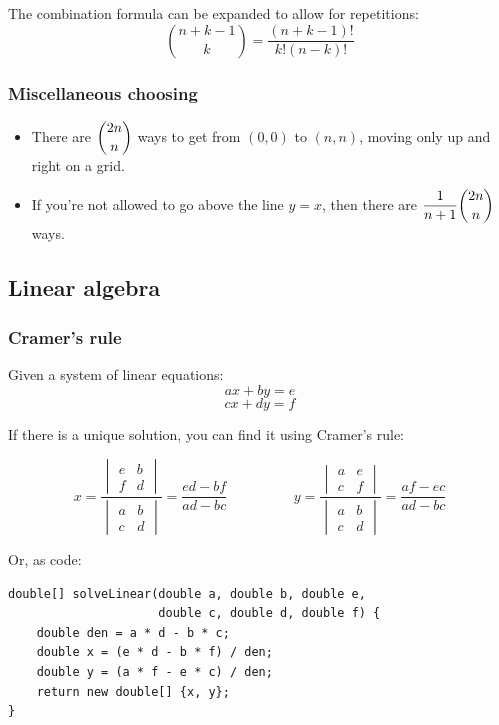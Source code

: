 \documentclass[a4paper,12pt]{article}
\begin{document}
The combination formula can be expanded to allow for repetitions:
\[{{n + k - 1}\choose k}=\frac{(n+k-1)!}{k!(n-k)!}\]

\subsubsection{Miscellaneous choosing}
\begin{itemize}
\item There are $\dbinom{2n}{n}$ ways to get from $(0,0)$ to $(n,n)$, moving only up and right on a grid.
\item If you're not allowed to go above the line $y=x$, then there are $\dfrac{1}{n+1}\dbinom{2n}{n}$ ways.
\end{itemize}

\subsection{Linear algebra}
\subsubsection{Cramer's rule}
Given a system of linear equations:
\[ax + by = e\]
\[cx + dy = f\]








\noindent If there is a unique solution, you can find it using Cramer's rule:

\[
x = \frac{\begin{vmatrix}e & b \\ f & d\end{vmatrix}}{\begin{vmatrix}a & b \\ c & d\end{vmatrix}} = \frac{ed-bf}{ad-bc}
\hspace{2cm}
y = \frac{\begin{vmatrix}a & e \\ c & f\end{vmatrix}}{\begin{vmatrix}a & b \\ c & d\end{vmatrix}} = \frac{af-ec}{ad-bc}
\]

\noindent Or, as code:

\begin{lstlisting}
double[] solveLinear(double a, double b, double e,
					 double c, double d, double f) {
	double den = a * d - b * c;
	double x = (e * d - b * f) / den;
	double y = (a * f - e * c) / den;
	return new double[] {x, y};
}
\end{lstlisting}
\end{document}
